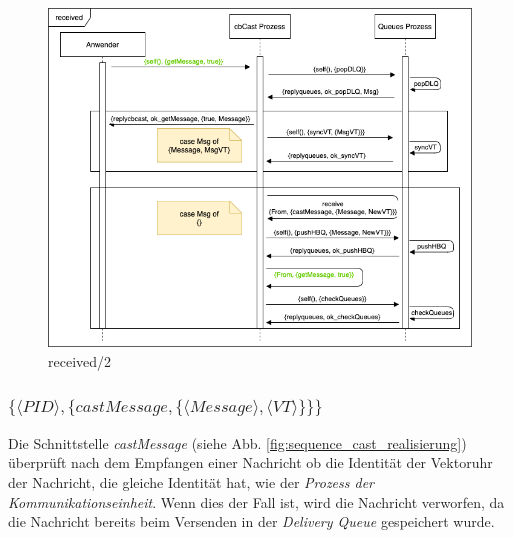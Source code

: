 \begin{figure}[htbp]
\begin{center}
\includegraphics[scale=0.6]{Latex/Bilder/receive_realisierung.png}
\caption{\label{fig:sequence_received_realisierung} received/2}
\end{center}
\end{figure}

\subsubsection{$\{\langle PID \rangle,\{castMessage,\{\langle Message \rangle, \langle VT \rangle\}\}\}$}

Die Schnittstelle \textit{castMessage} (siehe Abb. \ref{fig:sequence_cast_realisierung}) überprüft nach dem Empfangen einer Nachricht ob die Identität der Vektoruhr der Nachricht, die gleiche Identität hat, wie der \textit{Prozess der Kommunikationseinheit}. Wenn dies der Fall ist, wird die Nachricht verworfen, da die Nachricht bereits beim Versenden in der \textit{Delivery Queue} gespeichert wurde.

